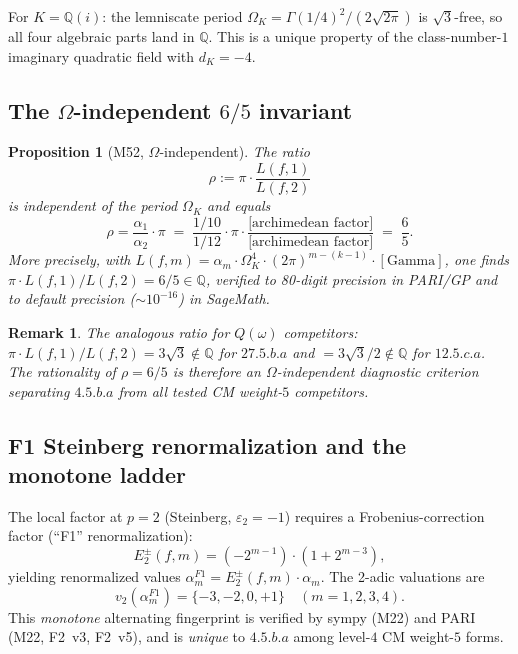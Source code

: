 \documentclass[12pt]{amsart}
\newtheorem{proposition}[conjecture]{Proposition}
\newtheorem{remark}[conjecture]{Remark}
\theoremstyle{definition}
\newcommand{\Q}{\mathbb{Q}}
\begin{document}
For $K = \Q(i)$: the lemniscate period $\Omega_K = \Gamma(1/4)^2/(2\sqrt{2\pi})$
is $\sqrt{3}$-free, so all four algebraic parts land in $\Q$.
This is a unique property of the class-number-$1$ imaginary quadratic field
with $d_K = -4$.

\subsection{The \texorpdfstring{$\Omega$}{Omega}-independent \texorpdfstring{$6/5$}{6/5} invariant}

\begin{proposition}[M52, $\Omega$-independent]
\label{prop:sixfifths}
The ratio
\[
  \rho := \pi \cdot \frac{L(f,1)}{L(f,2)}
\]
is independent of the period $\Omega_K$ and equals
\[
  \rho = \frac{\alpha_1}{\alpha_2} \cdot \pi
        \;=\; \frac{1/10}{1/12} \cdot \pi \cdot \frac{\text{[archimedean factor]}}{\text{[archimedean factor]}}
        \;=\; \frac{6}{5}.
\]
More precisely, with $L(f,m) = \alpha_m \cdot \Omega_K^4 \cdot (2\pi)^{m-(k-1)} \cdot \mathrm{[Gamma]}$,
one finds $\pi \cdot L(f,1)/L(f,2) = 6/5 \in \Q$,
verified to 80-digit precision in PARI/GP and to default precision ($\sim 10^{-16}$) in SageMath.
\end{proposition}

\begin{remark}
The analogous ratio for $Q(\omega)$ competitors:
$\pi \cdot L(f,1)/L(f,2) = 3\sqrt{3} \notin \Q$ for $27.5.b.a$
and $= 3\sqrt{3}/2 \notin \Q$ for $12.5.c.a$.
The rationality of $\rho = 6/5$ is therefore an $\Omega$-independent diagnostic
criterion separating $4.5.b.a$ from all tested CM weight-$5$ competitors.
\end{remark}

\subsection{F1 Steinberg renormalization and the monotone ladder}

The local factor at $p = 2$ (Steinberg, $\varepsilon_2 = -1$)
requires a Frobenius-correction factor (``F1'' renormalization):
\[
  E_2^\pm(f, m) = (-2^{m-1}) \cdot (1 + 2^{m-3}),
\]
yielding renormalized values $\alpha_m^{F1} = E_2^\pm(f,m) \cdot \alpha_m$.
The 2-adic valuations are
\[
  v_2(\alpha_m^{F1}) = \{-3, -2, 0, +1\} \quad (m = 1, 2, 3, 4).
\]
This \emph{monotone} alternating fingerprint is verified by sympy (M22)
and PARI (M22, F2~v3, F2~v5), and is \emph{unique} to $4.5.b.a$
among level-$4$ CM weight-$5$ forms.
\end{document}
